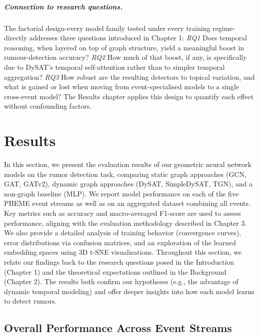 \documentclass{cshonours}
\begin{document}
\paragraph{Connection to research questions.}
The factorial design-every model family tested under every training regime-directly addresses three questions introduced in Chapter 1:  
\emph{RQ1} Does temporal reasoning, when layered on top of graph structure, yield a meaningful boost in rumour-detection accuracy?  
\emph{RQ2} How much of that boost, if any, is specifically due to DySAT's temporal self-attention rather than to simpler temporal aggregation?  
\emph{RQ3} How robust are the resulting detectors to topical variation, and what is gained or lost when moving from event-specialised models to a single cross-event model?  
The Results chapter applies this design to quantify each effect without confounding factors.




\chapter{Results}\label{sec:results}



In this section, we present the evaluation results of our geometric neural network models on the rumor detection task, comparing static graph approaches (GCN, GAT, GATv2), dynamic graph approaches (DySAT, SimpleDySAT, TGN), and a non-graph baseline (MLP). We report model performance on each of the five PHEME event streams as well as on an aggregated dataset combining all events. Key metrics such as accuracy and macro-averaged F1-score are used to assess performance, aligning with the evaluation methodology described in Chapter 3. We also provide a detailed analysis of training behavior (convergence curves), error distributions via confusion matrices, and an exploration of the learned embedding spaces using 3D t-SNE visualisations. Throughout this section, we relate our findings back to the research questions posed in the Introduction (Chapter 1) and the theoretical expectations outlined in the Background (Chapter 2). The results both confirm our hypotheses (e.g., the advantage of dynamic temporal modeling) and offer deeper insights into how each model learns to detect rumors.



\section{Overall Performance Across Event Streams}
\end{document}
